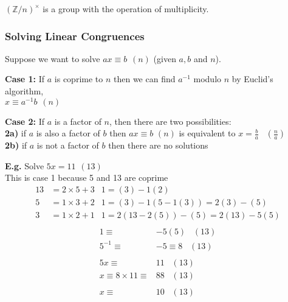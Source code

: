 \documentclass[11pt]{article}
\begin{document}
\begin{theorem}
	$(\mathbb{Z}/n)^{\times}$ is a group with the operation of multiplicity.
\end{theorem}

	
	
	\subsubsection{Solving Linear Congruences}

Suppose we want to solve $ax\equiv b \hspace{5pt} (n)$ (given $a,b$ and $n$).

\begin{flushleft}
	\textbf{Case 1:} If $a$ is coprime to $n$ then we can find $a^{-1}$ modulo $n$ by Euclid's algorithm,\\ \hspace{40pt} $x \equiv a^{-1}b \hspace{5pt} (n) $


	\textbf{Case 2:} If $a$ is a factor of $n$, then there are two possibilities:\\
	\hspace{40pt} \textbf{2a)} if $a$ is also a factor of $b$ then $ax \equiv b$ \hspace{3pt} $(n)$ is equivalent to $x = \frac{b}{a} \hspace{10pt} (\frac{n}{a})$\\
	\hspace{40pt} \textbf{2b)} if $a$ is not a factor of $b$ then there are no solutions

\end{flushleft}
\newpage 
\begin{flushleft}
	\textbf{E.g.} Solve $5x = 11 \hspace{5pt} (13)$\\
	This is case 1 because 5 and 13 are coprime
	\begin{align*}
		13 &= 2\times5 + 3   &1=(3) -1(2) \\
		5 &= 1\times3 + 2 &1=(3) -1(5-1(3)) = 2(3) -(5)\\
		3 &= 1\times2 + 1 & 1 =2(13 -2(5)) - (5) = 2(13)-5(5) \\
	\end{align*}
	\begin{align*}
		1\equiv& -5(5) \hspace{10pt} (13)\\
		 5^{-1} \equiv& -5 \equiv 8\hspace{10pt} (13)\\
		 \\
		5x\equiv& 11 \hspace{10pt} (13)\\
		x \equiv 8 \times 11 \equiv& 88 \hspace{10pt} (13)\\
		\\
		x \equiv & 10 \hspace{10pt} (13)
	\end{align*}
\end{flushleft}
\end{document}
